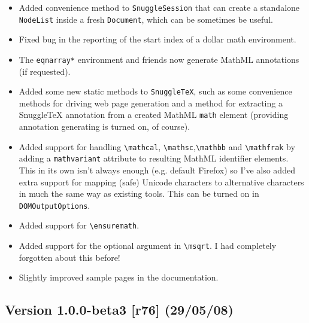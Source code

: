\begin{itemize}
  \item Added convenience method to \verb|SnuggleSession| that can create a
  standalone \verb|NodeList| inside a fresh \verb|Document|, which can be
  sometimes be useful.

  \item Fixed bug in the reporting of the start index of a dollar math
  environment.

  \item The \verb|eqnarray*| environment and friends now generate MathML
  annotations (if requested).

  \item Added some new static methods to \verb|SnuggleTeX|, such as some
  convenience methods for driving web page generation and a method for
  extracting a SnuggleTeX annotation from a created MathML \verb|math| element
  (providing annotation generating is turned on, of course).

  \item Added support for handling \verb|\mathcal|,
  \verb|\mathsc|,\verb|\mathbb| and \verb|\mathfrak| by adding a
  \verb|mathvariant| attribute to resulting MathML identifier elements. This in
  its own isn't always enough (e.g. default Firefox) so I've also added extra
  support for mapping (safe) Unicode characters to alternative characters in
  much the same way as existing tools. This can be turned on in
  \verb|DOMOutputOptions|.

  \item Added support for \verb|\ensuremath|.

  \item Added support for the optional argument in \verb|\msqrt|. I had
  completely forgotten about this before!

  \item Slightly improved sample pages in the documentation.

\end{itemize}

\subsection*{Version 1.0.0-beta3 [r76] (29/05/08)}

